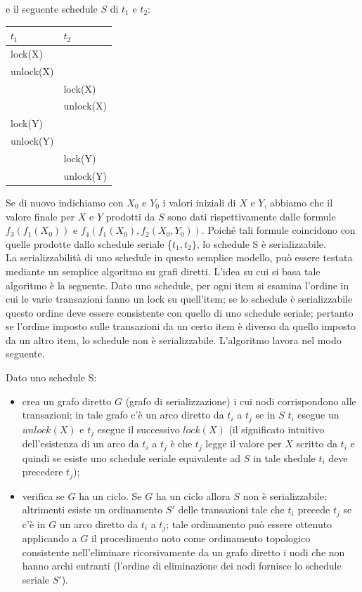 e il seguente schedule $S$ di $t_1$ e $t_2$:
\begin{center}
 \begin{tabular}{|l|l|}
 \hline
 $t_1$ & $t_2$\\
 \hline
   lock(X)&\\
   unlock(X)&\\
   &lock(X)\\
   &unlock(X)\\
   lock(Y)&\\ 
   unlock(Y)&\\
   &lock(Y)\\
   &unlock(Y)\\
   \hline
  \end{tabular}
\end{center}

Se di nuovo indichiamo con $X_0$ e $Y_0$ i valori iniziali di $X$ e $Y$, abbiamo che il valore finale per $X$ e $Y$
prodotti da $S$ sono dati rispettivamente dalle formule $f_3(f_1(X_0))$ e $f_4(f_1(X_0), f_2(X_0, Y_0))$. Poiché tali
formule coincidono con quelle prodotte dallo schedule seriale \{$t_1, t_2\}$, lo schedule S è serializzabile.\\

La serializzabilità di uno schedule in questo semplice modello, può essere testata mediante un
semplice algoritmo su grafi diretti. L'idea su cui si basa tale algoritmo è la seguente. Dato uno
schedule, per ogni item si esamina l'ordine in cui le varie transazioni fanno un lock su quell'item; se
lo schedule è serializzabile questo ordine deve essere consistente con quello di uno schedule seriale;
pertanto se l'ordine imposto sulle transazioni da un certo item è diverso da quello imposto da un
altro item, lo schedule non è serializzabile. L'algoritmo lavora nel modo seguente.

\begin{alg}
Dato uno schedule S:
\begin{itemize}
 \item crea un grafo diretto $G$ (grafo di serializzazione) i cui nodi corrispondono alle transazioni; in
tale grafo c'è un arco diretto da $t_i$ a $t_j$ se in $S$ $t_i$ esegue un $unlock(X)$ e $t_j$ esegue il successivo
$lock(X)$ (il significato intuitivo dell'esistenza di un arco da $t_i$ a $t_j$ è che $t_j$ legge il valore per $X$
scritto da $t_i$ e quindi se esiste uno schedule seriale equivalente ad $S$ in tale shedule $t_i$ deve
precedere $t_j$);
\item verifica se $G$ ha un ciclo. Se $G$ ha un ciclo allora $S$ non è serializzabile; altrimenti esiste un
ordinamento $S'$ delle transazioni tale che $t_i$ precede $t_j$ se c'è in $G$ un arco diretto da $t_i$ a $t_j$; tale
ordinamento può essere ottenuto applicando a $G$ il procedimento noto come ordinamento
topologico consistente nell'eliminare ricorsivamente da un grafo diretto i nodi che non hanno
archi entranti (l'ordine di eliminazione dei nodi fornisce lo schedule seriale $S'$).
\end{itemize}
\end{alg}

